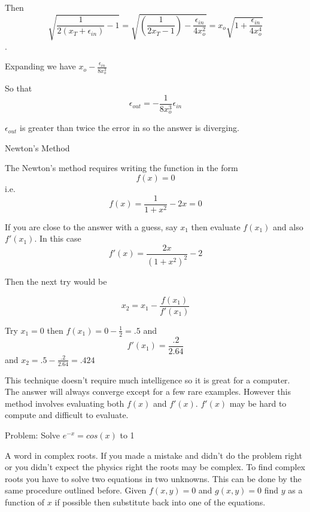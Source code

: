 \documentclass[a4paper,10pt]{article}
\begin{document}
Then $$\sqrt{\frac{1}{2(x_T+\epsilon_{in})}-1}=\sqrt{(\frac{1}{2x_T-1})-\frac{\epsilon_{in}}{4x_o^2}}=x_o\sqrt{1+\frac{\epsilon_{in}}{4x_o^4}}$$.

Expanding we have $x_o-\frac{\epsilon_{in}}{8x_o^3}$

So that $$\epsilon_{out}=-\frac{1}{8x_o^3}\epsilon_{in}$$

$\epsilon_{out}$ is greater than twice the error in so the answer is diverging. 

\begin{center}
Newton's Method
\end{center}
The Newton's method requires writing the function in the form
$$f(x)=0$$ i.e. 
$$f(x)=\frac{1}{1+x^2} - 2x = 0$$

If you are close to the answer with a guess, say $x_{1}$ then evaluate $f(x_{1})$ and also $f'(x_{1})$. In this case
$$f'(x) = \frac{2x}{(1+x^2)^2} - 2$$

Then the next try would be

$$x_{2}=x_{1}-\frac{f(x_{1})}{f'(x_{1})}$$

Try $x_{1}=0$ then $f(x_{1})=0-\frac{1}{2}=.5$ and $$f'(x_{1})=\frac{.2}{2.64}$$
and $x_{2}=.5-\frac{.2}{2.64}=.424$

This technique doesn't require much intelligence so it is great for a computer. 
The answer will always converge except for a few rare examples. 
However this method involves evaluating both $f(x)$ and $f'(x)$. 
$f'(x)$ may be hard to compute and difficult to evaluate.

Problem: Solve $e^{-x}=cos(x)$ to 1%

A word in complex roots. If you made a mistake and didn't do the problem right or you didn't expect
the physics right the roots may be complex. To find complex roots you have to solve two equations in two unknowns. 
This can be done by the same procedure outlined before. Given $f(x,y)=0$ and $g(x,y)=0$ find $y$ as a function of 
$x$ if possible then substitute back into one of the equations.
\end{document}

